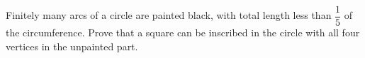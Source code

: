Finitely many arcs of a circle are painted black, with total length less than $\dfrac15$ of the circumference. Prove that a square can be inscribed in the circle with all four vertices in the unpainted part.
